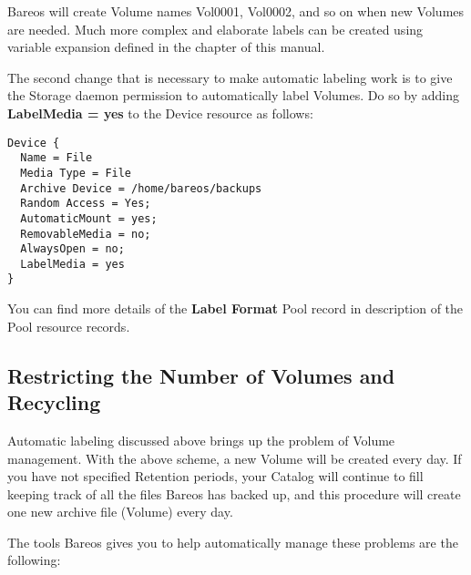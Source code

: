 Bareos will create Volume names Vol0001, Vol0002, and so on when new Volumes
are needed. Much more complex and elaborate labels can be created using
variable expansion defined in the
 chapter of this manual.

The second change that is necessary to make automatic labeling work is to give
the Storage daemon permission to automatically label Volumes. Do so by adding
{\bf LabelMedia = yes} to the Device resource as follows:

\footnotesize
\begin{verbatim}
Device {
  Name = File
  Media Type = File
  Archive Device = /home/bareos/backups
  Random Access = Yes;
  AutomaticMount = yes;
  RemovableMedia = no;
  AlwaysOpen = no;
  LabelMedia = yes
}
\end{verbatim}
\normalsize

You can find more details of the {\bf Label Format} Pool record in
 description of the Pool resource
records.

\label{Recycling1}
\subsection{Restricting the Number of Volumes and Recycling}

Automatic labeling discussed above brings up the problem of Volume management.
With the above scheme, a new Volume will be created every day. If you have not
specified Retention periods, your Catalog will continue to fill keeping track
of all the files Bareos has backed up, and this procedure will create one new
archive file (Volume) every day.

The tools Bareos gives you to help automatically manage these problems are the
following:


